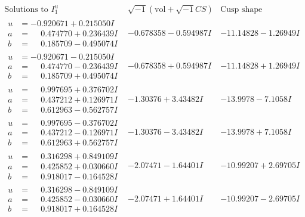 \documentclass[1p]{elsarticle_modified}
\theoremstyle{definition}
\newcommand{\I}{\sqrt{-1}}
\begin{document}
$$\begin{array}{c|c|c}  
\text{Solutions to }I^u_{1}& \I (\text{vol} + \sqrt{-1}CS) & \text{Cusp shape}\\
 \hline 
\begin{aligned}
u &= -0.920671 + 0.215050 I \\
a &= \phantom{-}0.474770 + 0.236439 I \\
b &= \phantom{-}0.185709 - 0.495074 I\end{aligned}
 & -0.678358 - 0.594987 I & -11.14828 - 1.26949 I \\ \hline\begin{aligned}
u &= -0.920671 - 0.215050 I \\
a &= \phantom{-}0.474770 - 0.236439 I \\
b &= \phantom{-}0.185709 + 0.495074 I\end{aligned}
 & -0.678358 + 0.594987 I & -11.14828 + 1.26949 I \\ \hline\begin{aligned}
u &= \phantom{-}0.997695 + 0.376702 I \\
a &= \phantom{-}0.437212 + 0.126971 I \\
b &= \phantom{-}0.612963 - 0.562757 I\end{aligned}
 & -1.30376 + 3.43482 I & -13.9978 - 7.1058 I \\ \hline\begin{aligned}
u &= \phantom{-}0.997695 - 0.376702 I \\
a &= \phantom{-}0.437212 - 0.126971 I \\
b &= \phantom{-}0.612963 + 0.562757 I\end{aligned}
 & -1.30376 - 3.43482 I & -13.9978 + 7.1058 I \\ \hline\begin{aligned}
u &= \phantom{-}0.316298 + 0.849109 I \\
a &= \phantom{-}0.425852 + 0.030660 I \\
b &= \phantom{-}0.918017 - 0.164528 I\end{aligned}
 & -2.07471 - 1.64401 I & -10.99207 + 2.69705 I \\ \hline\begin{aligned}
u &= \phantom{-}0.316298 - 0.849109 I \\
a &= \phantom{-}0.425852 - 0.030660 I \\
b &= \phantom{-}0.918017 + 0.164528 I\end{aligned}
 & -2.07471 + 1.64401 I & -10.99207 - 2.69705 I \\ \hline\begin{aligned}

\end{aligned}
\end{array}$$
\end{document}
